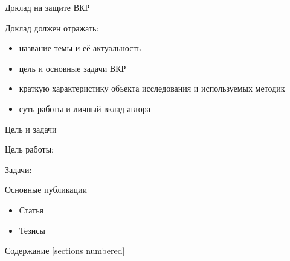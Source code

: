 \begin{frame}
  \setcounter{framenumber}{1}
  \maketitle
\end{frame}

\begin{frame}{Доклад на защите ВКР}

  Доклад должен отражать:
  \begin{itemize}
    \item название темы и её актуальность
    \item цель и основные задачи ВКР
    \item краткую характеристику объекта исследования и используемых методик
    \item суть работы и личный вклад автора
  \end{itemize}
\end{frame}

\begin{frame}[t]{Цель и задачи}
  \begin{block}{Цель работы:}\vspace{0pt}
    \aim
  \end{block}

  \medskip
  \begin{block}{Задачи:}\vspace{0pt}
    \tasks
  \end{block}
\end{frame}

\begin{frame}{Основные публикации}

  \begin{itemize}
    \item Статья
    \item Тезисы
  \end{itemize}
\end{frame}


\begin{frame}{Содержание}
  [sections numbered]
  \tableofcontents[hideallsubsections]
\end{frame}

